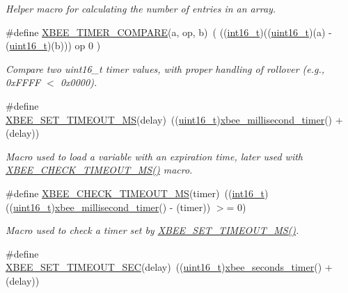 \begin{DoxyCompactItemize}
\begin{DoxyCompactList}\small\item\em Helper macro for calculating the number of entries in an array. \end{DoxyCompactList}\item 
\#define \hyperlink{group__hal_ga9a3ee9eece1e3ee1c6fbaa27bc0928d3}{X\-B\-E\-E\-\_\-\-T\-I\-M\-E\-R\-\_\-\-C\-O\-M\-P\-A\-R\-E}(a, op, b)~( ((\hyperlink{group__hal_ga2140805d08462d474b82ddc8d1c2f3e6}{int16\-\_\-t})((\hyperlink{group__hal_ga5a8b2dc9e45a9ee81a94ef304fb62505}{uint16\-\_\-t})(a) -\/ (\hyperlink{group__hal_ga5a8b2dc9e45a9ee81a94ef304fb62505}{uint16\-\_\-t})(b))) op 0 )
\begin{DoxyCompactList}\small\item\em Compare two uint16\-\_\-t timer values, with proper handling of rollover (e.\-g., 0x\-F\-F\-F\-F $<$ 0x0000). \end{DoxyCompactList}\item 
\#define \hyperlink{group__hal_ga848a9903fa7859d84cb22aeddde4c42f}{X\-B\-E\-E\-\_\-\-S\-E\-T\-\_\-\-T\-I\-M\-E\-O\-U\-T\-\_\-\-M\-S}(delay)~((\hyperlink{group__hal_ga5a8b2dc9e45a9ee81a94ef304fb62505}{uint16\-\_\-t})\hyperlink{group__hal_ga22b4e3df788254ca5f8530e9aee58515}{xbee\-\_\-millisecond\-\_\-timer}() + (delay))
\begin{DoxyCompactList}\small\item\em Macro used to load a variable with an expiration time, later used with \hyperlink{group__hal_gac3485c3c34a50a5a35d553cc743d163e}{X\-B\-E\-E\-\_\-\-C\-H\-E\-C\-K\-\_\-\-T\-I\-M\-E\-O\-U\-T\-\_\-\-M\-S()} macro. \end{DoxyCompactList}\item 
\#define \hyperlink{group__hal_gac3485c3c34a50a5a35d553cc743d163e}{X\-B\-E\-E\-\_\-\-C\-H\-E\-C\-K\-\_\-\-T\-I\-M\-E\-O\-U\-T\-\_\-\-M\-S}(timer)~((\hyperlink{group__hal_ga2140805d08462d474b82ddc8d1c2f3e6}{int16\-\_\-t})((\hyperlink{group__hal_ga5a8b2dc9e45a9ee81a94ef304fb62505}{uint16\-\_\-t})\hyperlink{group__hal_ga22b4e3df788254ca5f8530e9aee58515}{xbee\-\_\-millisecond\-\_\-timer}() -\/ (timer)) $>$= 0)
\begin{DoxyCompactList}\small\item\em Macro used to check a timer set by \hyperlink{group__hal_ga848a9903fa7859d84cb22aeddde4c42f}{X\-B\-E\-E\-\_\-\-S\-E\-T\-\_\-\-T\-I\-M\-E\-O\-U\-T\-\_\-\-M\-S()}. \end{DoxyCompactList}\item 
\#define \hyperlink{group__hal_ga6adb5c9e19c84a261c569ff4d77d1170}{X\-B\-E\-E\-\_\-\-S\-E\-T\-\_\-\-T\-I\-M\-E\-O\-U\-T\-\_\-\-S\-E\-C}(delay)~((\hyperlink{group__hal_ga5a8b2dc9e45a9ee81a94ef304fb62505}{uint16\-\_\-t})\hyperlink{group__hal_ga5c1a8bccd41acf1d7264a75698077749}{xbee\-\_\-seconds\-\_\-timer}() + (delay))

\end{DoxyCompactItemize}
